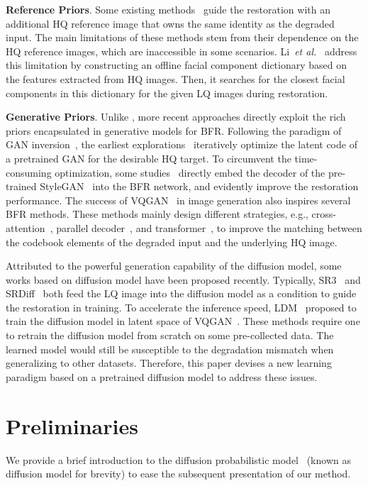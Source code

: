 \documentclass[10pt,twocolumn,letterpaper]{article}
\begin{document}
\noindent\textbf{Reference Priors}. 
Some existing methods~\cite{li2018learning,dogan2019exemplar} guide the restoration with an additional HQ reference image that owns the same identity as the degraded input. The main limitations of these methods stem from their dependence on the HQ reference images, which are inaccessible in some scenarios.
Li~\textit{et al.}~\cite{li2020blind} address this limitation by constructing an offline facial component dictionary based on the features extracted from HQ images. Then, it searches for the closest facial components in this dictionary for the given LQ images during restoration. 

\noindent\textbf{Generative Priors}. Unlike \cite{li2020blind},  more recent approaches directly exploit the rich priors encapsulated in generative models for BFR. Following the paradigm of GAN inversion~\cite{xia2022gan}, the earliest explorations~\cite{menon2020pulse,gu2020image,pan2021exploiting} iteratively optimize the latent code of a pretrained GAN for the desirable HQ target. To circumvent the time-consuming optimization, some studies~\cite{chan2021glean,wang2021towards,yang2021gan} directly embed the decoder of the pre-trained StyleGAN~\cite{karras2019style} into the BFR network, and evidently improve the restoration performance.
The success of VQGAN~\cite{esser2021taming} in image generation also inspires several BFR methods. These methods mainly design different strategies, e.g., cross-attention~\cite{wang2022restoreformer}, parallel decoder~\cite{gu2022vqfr}, and transformer~\cite{toward2022zhou}, to improve the matching between the codebook elements of the degraded input and the underlying HQ image.


Attributed to the powerful generation capability of the diffusion model, some works based on diffusion model have been proposed recently. Typically, SR3~\cite{saharia2022image} and SRDiff~\cite{li2022srdiff} both feed the LQ image into the diffusion model as a condition to guide the restoration in training.
To accelerate the inference speed, LDM~\cite{rombach2022high} proposed to train the diffusion model in latent space of VQGAN~\cite{esser2021taming}.
These methods require one to retrain the diffusion model from scratch on some pre-collected data. The learned model would still be susceptible to the degradation mismatch when generalizing to other datasets. Therefore, this paper devises a new learning paradigm based on a pretrained diffusion model to address these issues.

\section{Preliminaries}\label{sec:preliminary}
We provide a brief introduction to the diffusion probabilistic model~\cite{sohl2015deep} (known as diffusion model for brevity) to ease the subsequent presentation of our method.
\end{document}

